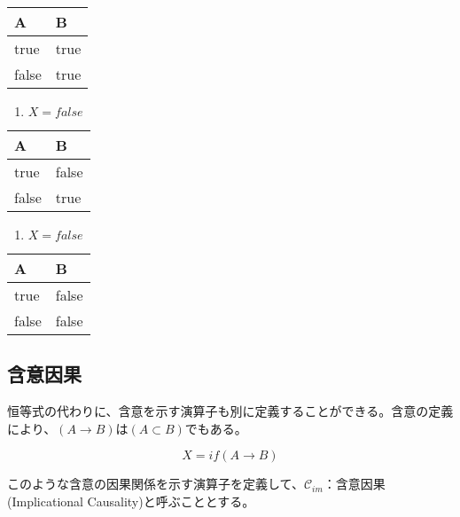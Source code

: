 \documentclass[12pt]{article}
\begin{document}
\begin{longtable}[]{@{}ll@{}}
\toprule\noalign{}
A & B \\
\midrule\noalign{}
\endhead
\bottomrule\noalign{}
\endlastfoot
true & true \\
false & true \\
\end{longtable}

\begin{enumerate}
\def\labelenumi{\arabic{enumi}.}
\setcounter{enumi}{2}

\item
  \(X=false\)
\end{enumerate}

\begin{longtable}[]{@{}ll@{}}
\toprule\noalign{}
A & B \\
\midrule\noalign{}
\endhead
\bottomrule\noalign{}
\endlastfoot
true & false \\
false & true \\
\end{longtable}

\begin{enumerate}
\def\labelenumi{\arabic{enumi}.}
\setcounter{enumi}{3}

\item
  \(X=false\)
\end{enumerate}

\begin{longtable}[]{@{}ll@{}}
\toprule\noalign{}
A & B \\
\midrule\noalign{}
\endhead
\bottomrule\noalign{}
\endlastfoot
true & false \\
false & false \\
\end{longtable}

\subsection{含意因果}\label{ux542bux610fux56e0ux679c}

恒等式の代わりに、含意を示す演算子も別に定義することができる。含意の定義により、\((A \rightarrow B)\)は\((A\subset B)\)でもある。

\begin{equation} X = if ( A  \rightarrow B)\end{equation}

このような含意の因果関係を示す演算子を定義して、\(\mathcal{C}_{im}\)：含意因果(Implicational
Causality)と呼ぶこととする。
\end{document}
